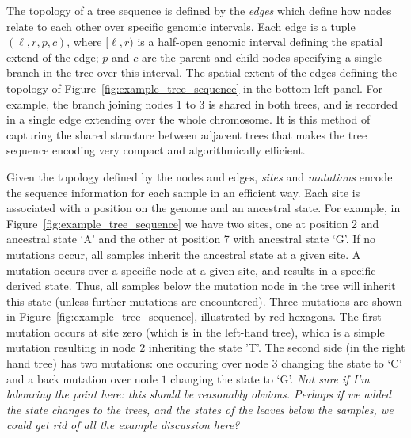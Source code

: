 \documentclass{article}
\newcommand{\jk}[1]{{\em \color{red} #1}}
\begin{document}
The topology of a tree sequence is defined by the \emph{edges} which define how
nodes relate to each other over specific genomic intervals. Each edge is a tuple
$(\ell, r, p, c)$, where $[\ell, r)$ is a half-open genomic interval defining the
spatial extend of the edge; $p$ and $c$ are the parent and child nodes specifying
a single branch in the tree over this interval. The spatial extent of the
edges defining the topology of Figure~\ref{fig:example_tree_sequence} in the
bottom left panel. For example, the branch joining nodes 1 to 3 is shared in both trees,
and is recorded in a single edge extending over the whole chromosome. It is this
method of capturing the shared structure between adjacent trees that makes the
tree sequence encoding very compact and algorithmically efficient.

Given the topology defined by the nodes and edges, \emph{sites} and \emph{mutations}
encode the sequence information for each sample in an efficient way. Each site
is associated with a position on the genome and an ancestral state. For example,
in Figure~\ref{fig:example_tree_sequence} we have two sites, one at position
2 and ancestral state `A' and the other at position 7 with ancestral state `G'. If
no mutations occur, all samples inherit the ancestral state at a given site.
A mutation occurs over a specific node at a given site, and results in a specific
derived state. Thus, all samples below the mutation node in the tree will inherit
this state (unless further mutations are encountered). Three mutations are shown
in Figure~\ref{fig:example_tree_sequence}, illustrated by red hexagons. The first
mutation occurs at site zero (which is in the left-hand tree), which is a simple
mutation resulting in node $2$ inheriting the state 'T'. The second side (in the
right hand tree) has two mutations: one occuring over node $3$ changing the state to
`C' and a back mutation over node $1$ changing the state to `G'.
\jk{Not sure if I'm labouring the point here: this should be reasonably obvious.
Perhaps if we added the state changes to the trees, and the states of the leaves
below the samples, we could get rid of all the example discussion here?}
\end{document}
